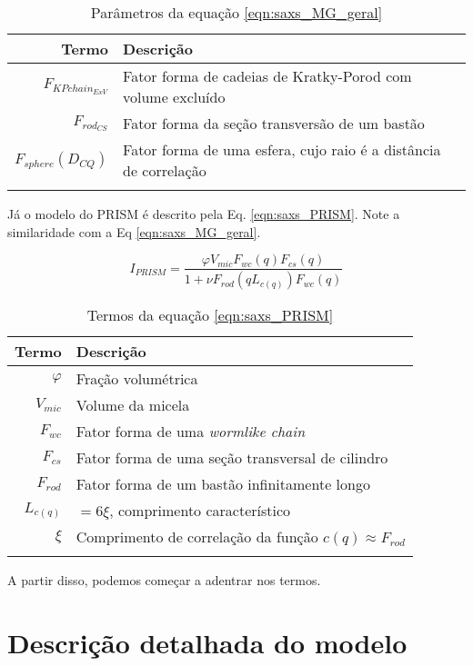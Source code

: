 \begin{apendicesenv}
	\begin{longtable}[c]{r p{12cm}}
		\toprule
		Termo 			& Descrição        						\\
		\midrule
		$F_{KPchain_{ExV}}$  & Fator forma de cadeias de Kratky-Porod com volume excluído \\
		$F_{rod_{CS}}$		 & Fator forma da seção transversão de um bastão	\\
		$F_{sphere}(D_{CQ})$ & Fator forma de uma esfera, cujo raio é a distância de correlação \\
		\bottomrule
		\caption{Parâmetros da equação \ref{eqn:saxs_MG_geral}}
		\label{tab_ap:fatores_geral} 
	\end{longtable}
	
	Já o modelo do PRISM é descrito pela Eq. \ref{eqn:saxs_PRISM}. Note a similaridade com a Eq \ref{eqn:saxs_MG_geral}.
	
	\begin{equation}
	I_{PRISM}= \frac{\varphi V_{mic}F_{wc}(q)F_{cs}(q)}{1 + \nu F_{rod}(qL_{c(q)})F_{wc}(q)}
	\label{eqn:saxs_PRISM}
	\end{equation}
	
	\begin{longtable}[c]{r p{12cm}}
		\toprule
		Termo 			& Descrição        						\\
		\midrule
		$\varphi$		& Fração volumétrica \\ %
		$V_{mic}$		& Volume da micela   \\
		$F_{wc}$		& Fator forma de uma \emph{wormlike chain} \\
		$F_{cs}$		& Fator forma de uma seção transversal de cilindro \\ %
		$F_{rod}$		& Fator forma de um bastão infinitamente longo \\
		$L_{c(q)}$		& $=6\xi$, comprimento característico \\
		$\xi$			& Comprimento de correlação da função $c(q) \approx F_{rod}$ \\
		\bottomrule
		\caption{Termos da equação \ref{eqn:saxs_PRISM}}
		\label{tab_ap:PRISM_geral} 
	\end{longtable}
	
	A partir disso, podemos começar a adentrar nos termos.
	
	\section{Descrição detalhada do modelo}
	

\end{apendicesenv}
